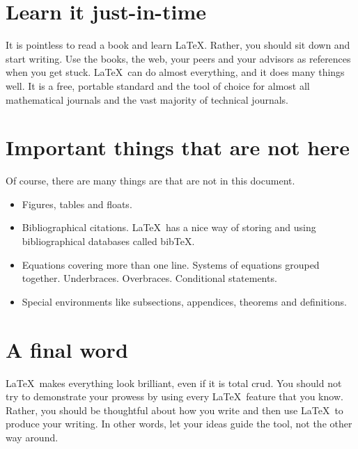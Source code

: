 \documentclass[12pt]{article}
\begin{document}
\section{Learn it just-in-time}

It is pointless to read a book and learn \LaTeX.  Rather, you should
sit down and start writing. Use the books, the web, your peers and
your advisors as references when you get stuck.  \LaTeX\ can do almost
everything, and it does many things well.  
It is a free, portable standard
and the tool of choice for almost all mathematical journals and the
vast majority of technical journals.

\section{Important things that are not here}

Of course, there are many things are that are not in this document.
\begin{itemize}

\item Figures, tables and floats.

\item Bibliographical citations.  \LaTeX\ has a nice way of storing
  and using bibliographical databases called bib\TeX.

\item Equations covering more than one line.  Systems of equations
  grouped together.  Underbraces.  Overbraces.  Conditional
  statements.

\item Special environments like subsections, appendices, theorems and
  definitions.

\end{itemize}

\section{A final word}

\LaTeX\ makes everything look brilliant, even if it is total crud.  You
should not try to demonstrate your prowess by using every \LaTeX\ 
feature that you know.   Rather, you should be thoughtful about how
you write and then use \LaTeX \ to produce your writing.  In other
words, let
your ideas guide the tool, not the other way around.
\end{document}
